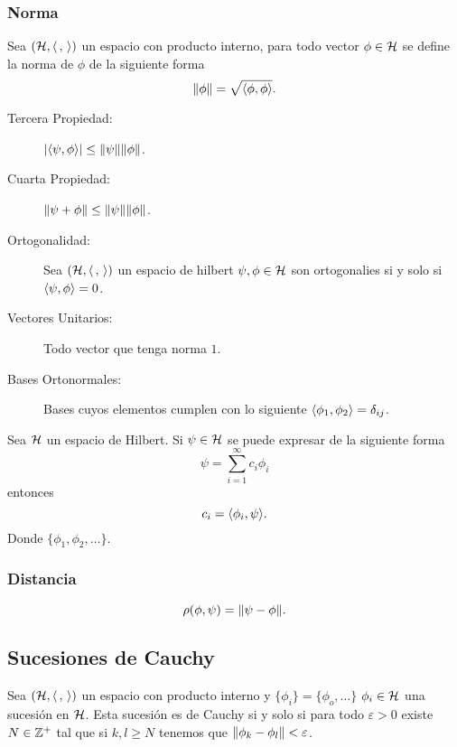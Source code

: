 \subsubsection{Norma}
Sea $(\mathcal{H} ,\langle \, , \, \rangle)$ un espacio con producto interno, para todo vector $\phi \in \mathcal{H}$ se define la norma de $\phi$ de la siguiente forma
	$$ \norm{\phi} = \sqrt{\langle \phi , \phi \rangle}. $$
\begin{description}
	\item[Tercera Propiedad: ] $\abs{\langle \psi , \phi \rangle} \leq \norm{\psi}\norm{\phi}$.
	\item[Cuarta Propiedad: ] $\norm{\psi + \phi} \leq \norm{\psi} \norm{\phi}$.
	\item[Ortogonalidad: ] Sea $\qty(\mathcal{H} ,\langle \, , \, \rangle)$ un espacio de hilbert $\psi ,\phi \in \mathcal{H}$ son ortogonalies si y solo si $\langle \psi , \phi \rangle = 0$.
	\item[Vectores Unitarios: ] Todo vector que tenga norma $1$.
	\item[Bases Ortonormales: ] Bases cuyos elementos cumplen con lo siguiente $\langle \phi _1 , \phi _2 \rangle = \delta _{ij}$. 
\end{description}


\begin{teorema}
	Sea $\mathcal{H}$ un espacio de Hilbert. Si $\psi \in \mathcal{H}$ se puede expresar de la siguiente forma
		$$ \psi = \sum _{i=1} ^\infty c_i \phi _i $$
	entonces
		$$ c_i = \langle \phi _i , \psi \rangle. $$
	Donde $\{ \phi _1,\phi _2,\ldots \}$.
\end{teorema}






\subsubsection{Distancia}
$$ \rho(\phi,\psi) = \norm{\psi - \phi}. $$

\subsection{Sucesiones de Cauchy}
Sea $(\mathcal{H} ,\langle \, , \, \rangle)$ un espacio con producto interno y $\{ \phi _i \} = \{ \phi _o,\ldots \}$ $\phi_i \in \mathcal{H}$ una sucesión en $\mathcal{H}$. Esta sucesión es de Cauchy si y solo si para todo $\varepsilon > 0$ existe $N\in \mathbb{Z} ^+$ tal que si $k,l \geq N$ tenemos que $\norm{\phi _k - \phi _l} < \varepsilon$.


